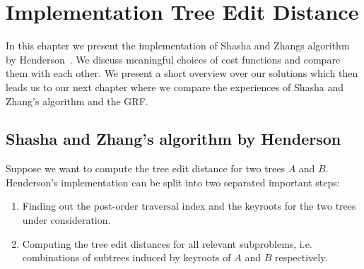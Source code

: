 \chapter{Implementation Tree Edit Distance}
In this chapter we present the implementation of Shasha and Zhangs algorithm by Henderson~\cite{Hen}. We discuss meaningful choices of cost functions and compare them with each other. We present a short overview over our solutions which then leads us to our next chapter where we compare the experiences of Shasha and Zhang's algorithm and the GRF.

\section{Shasha and Zhang's algorithm by Henderson}
Suppose we want to compute the tree edit distance for two trees $A$ and $B$. Henderson's implementation can be split into two separated important steps:
\begin{enumerate}
\item Finding out the post-order traversal index and the keyroots for the two trees under consideration.
\item Computing the tree edit distances for all relevant subproblems, i.e. combinations of subtrees induced by keyroots of $A$ and $B$ respectively.
\end{enumerate}

